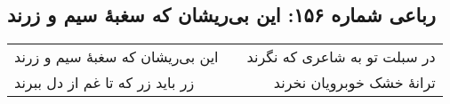 \begin{center}
\section*{رباعی شماره ۱۵۶: این بی‌ریشان که سغبهٔ سیم و زرند}
\label{sec:sh156}
\begin{longtable}{l p{0.5cm} r}
این بی‌ریشان که سغبهٔ سیم و زرند
&&
در سبلت تو به شاعری که نگرند
\\
زر باید زر که تا غم از دل ببرند
&&
ترانهٔ خشک خوبرویان نخرند
\\
\end{longtable}
\end{center}
